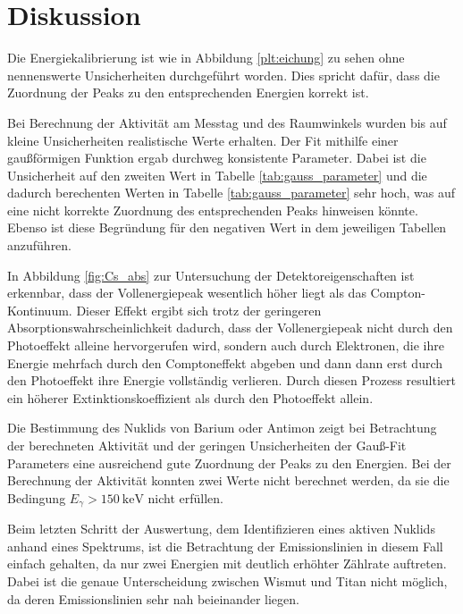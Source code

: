 \section{Diskussion}
\label{sec:Diskussion}
Die Energiekalibrierung ist wie in Abbildung \ref{plt:eichung}
zu sehen ohne nennenswerte Unsicherheiten durchgeführt worden. Dies spricht
dafür, dass die Zuordnung der Peaks zu den entsprechenden Energien korrekt ist.

Bei Berechnung der Aktivität am Messtag und des Raumwinkels wurden bis auf kleine
Unsicherheiten realistische Werte erhalten. Der Fit mithilfe einer gaußförmigen
Funktion ergab durchweg konsistente Parameter. Dabei ist die Unsicherheit auf
den zweiten Wert in Tabelle \ref{tab:gauss_parameter} und die dadurch
berechenten Werten in Tabelle \ref{tab:gauss_parameter} sehr hoch, was auf eine
nicht korrekte Zuordnung des entsprechenden Peaks hinweisen könnte. Ebenso ist
diese Begründung für den negativen Wert in dem jeweiligen Tabellen
anzuführen.

In Abbildung \ref{fig:Cs_abs} zur Untersuchung der Detektoreigenschaften ist erkennbar,
dass der Vollenergiepeak wesentlich höher liegt als
das Compton-Kontinuum. Dieser Effekt ergibt sich trotz der geringeren
Absorptionswahrscheinlichkeit dadurch, dass der Vollenergiepeak nicht durch den
Photoeffekt alleine hervorgerufen wird, sondern auch durch Elektronen, die ihre
Energie mehrfach durch den Comptoneffekt abgeben und dann dann erst durch den
Photoeffekt ihre Energie vollständig verlieren. Durch diesen Prozess resultiert
ein höherer Extinktionskoeffizient als durch den Photoeffekt allein.

Die Bestimmung des Nuklids von Barium oder Antimon zeigt bei Betrachtung der
berechneten Aktivität und der geringen Unsicherheiten der Gauß-Fit Parameters
eine ausreichend gute Zuordnung der Peaks zu den Energien. Bei der Berechnung
der Aktivität konnten zwei Werte nicht berechnet werden, da sie die Bedingung
$E_\gamma > \SI{150}{\kilo\electronvolt}$ nicht erfüllen. 

Beim letzten Schritt der Auswertung, dem Identifizieren eines aktiven Nuklids
anhand eines Spektrums, ist die Betrachtung der Emissionslinien in diesem Fall
einfach gehalten, da nur zwei Energien mit deutlich erhöhter Zählrate auftreten.
Dabei ist die genaue Unterscheidung zwischen Wismut und Titan nicht möglich, da
deren Emissionslinien sehr nah beieinander liegen.
